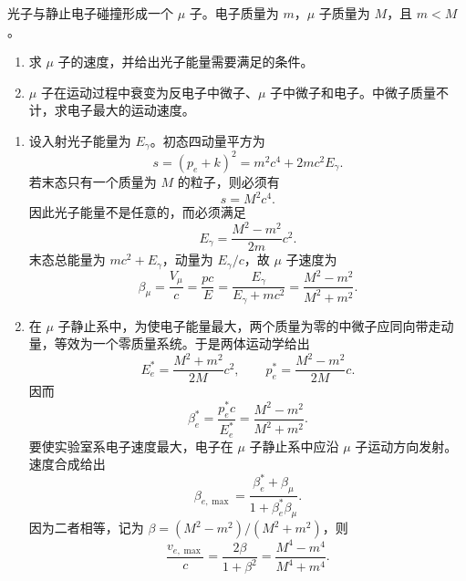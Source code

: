 \begin{question}[光子与静止电子碰撞形成 $\mu$ 子]
光子与静止电子碰撞形成一个 $\mu$ 子。电子质量为 $m$，$\mu$ 子质量为 $M$，且 $m<M$。
\begin{enumerate}
  \item 求 $\mu$ 子的速度，并给出光子能量需要满足的条件。
  \item $\mu$ 子在运动过程中衰变为反电子中微子、$\mu$ 子中微子和电子。中微子质量不计，求电子最大的运动速度。
\end{enumerate}
\begin{solution}
\begin{enumerate}
  \item 设入射光子能量为 $E_\gamma$。初态四动量平方为
  \[
    s=(p_e+k)^2=m^2c^4+2mc^2E_\gamma .
  \]
  若末态只有一个质量为 $M$ 的粒子，则必须有
  \[
    s=M^2c^4 .
  \]
  因此光子能量不是任意的，而必须满足
  \[
    \boxed{E_\gamma=\frac{M^2-m^2}{2m}c^2} .
  \]
  末态总能量为 $mc^2+E_\gamma$，动量为 $E_\gamma/c$，故 $\mu$ 子速度为
  \[
    \beta_\mu=\frac{V_\mu}{c}=\frac{pc}{E}
    =\frac{E_\gamma}{E_\gamma+mc^2}
    =\boxed{\frac{M^2-m^2}{M^2+m^2}} .
  \]

  \item 在 $\mu$ 子静止系中，为使电子能量最大，两个质量为零的中微子应同向带走动量，等效为一个零质量系统。于是两体运动学给出
  \[
    E_e^*=\frac{M^2+m^2}{2M}c^2,
    \qquad
    p_e^*=\frac{M^2-m^2}{2M}c .
  \]
  因而
  \[
    \beta_e^* =\frac{p_e^*c}{E_e^*}
    =\frac{M^2-m^2}{M^2+m^2} .
  \]
  要使实验室系电子速度最大，电子在 $\mu$ 子静止系中应沿 $\mu$ 子运动方向发射。速度合成给出
  \[
    \beta_{e,\max}=\frac{\beta_e^*+\beta_\mu}{1+\beta_e^*\beta_\mu} .
  \]
  因为二者相等，记为 $\beta=(M^2-m^2)/(M^2+m^2)$，则
  \[
    \boxed{\frac{v_{e,\max}}{c}=\frac{2\beta}{1+\beta^2}
    =\frac{M^4-m^4}{M^4+m^4}} .
  \]
\end{enumerate}
\end{solution}
\end{question}

